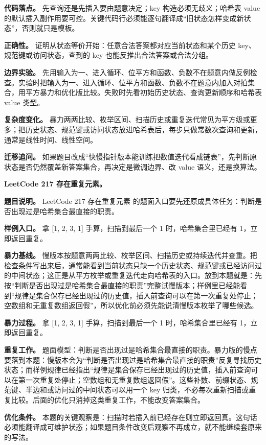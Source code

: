 \textbf{代码落点。} 先查询还是先插入要由题意决定；key 构造必须无歧义；哈希表 value 的默认插入副作用要可控。关键代码行必须能逐句翻译成“旧状态怎样变成新状态”，否则就只是模板。

\textbf{正确性。} 证明从状态等价开始：任意合法答案都对应当前状态和某个历史 key、规范键或访问状态，查到的 key 也能反推出合法答案或合法分组。

\textbf{边界实验。} 先用输入为一、进入循环、位平方和函数、负数不在题意内做反例检查。实验时把输入为一、进入循环、位平方和函数、负数不在题意内加入对拍集合，用平方暴力和优化版比较。失败时先看初始历史状态、查询更新顺序和哈希表 value 类型。

\textbf{复杂度变化。} 暴力两两比较、枚举区间、扫描历史或重复迭代常见为平方级或更多；把历史状态、规范键或访问状态放进哈希表后，每步只做常数次查询和更新，通常是线性时间、线性空间。

\textbf{迁移追问。} 如果题目改成“快慢指针版本能训练把数值迭代看成链表”，先判断原状态是否仍然覆盖新答案集合，再决定是微调边界、改 value 语义，还是换算法。

\noindent\textbf{LeetCode 217 存在重复元素。}

\textbf{题目说明。} LeetCode 217 存在重复元素 的题面入口要先还原成具体任务：判断是否出现过是哈希集合最直接的职责。

\textbf{样例入口。} 拿 [1, 2, 3, 1] 手算，扫描到最后一个 1 时，哈希集合里已经有 1，立即返回重复。

\textbf{暴力基线。} 慢版本按题意两两比较、枚举区间、扫描历史或持续迭代并查重。把检查条件写出来后，通常能看到当前状态只缺一个历史状态、规范键或已经访问过的中间状态；这正是从平方枚举或重复迭代走向哈希表的入口。放到本题就是：先按“判断是否出现过是哈希集合最直接的职责”完整试慢版本；样例里已经能看到“规律是集合保存已经出现过的历史值，插入前查询可以在第一次重复处停止；空数组和无重复数组返回假”，所以优化前必须先能说清慢版本枚举了哪些候选。

\textbf{暴力过程。} 拿 [1, 2, 3, 1] 手算，扫描到最后一个 1 时，哈希集合里已经有 1，立即返回重复。

\textbf{重复工作。} 题面模型：判断是否出现过是哈希集合最直接的职责。暴力版的慢点要落到本题：慢版本会为“判断是否出现过是哈希集合最直接的职责”反复寻找历史状态；而样例规律已经指出“规律是集合保存已经出现过的历史值，插入前查询可以在第一次重复处停止；空数组和无重复数组返回假”。这些补数、前缀状态、规范键、半边和或访问过的中间状态可以用一个 key 归类，不必每次重新扫描或重复比较。后面的优化只消掉这类重复工作，不能改变答案集合。

\textbf{优化条件。} 本题的关键观察是：扫描时若插入前已经存在则立即返回真。这句话必须能翻译成可维护状态；如果题目条件改变后观察不再成立，就不能继续套原来的写法。


